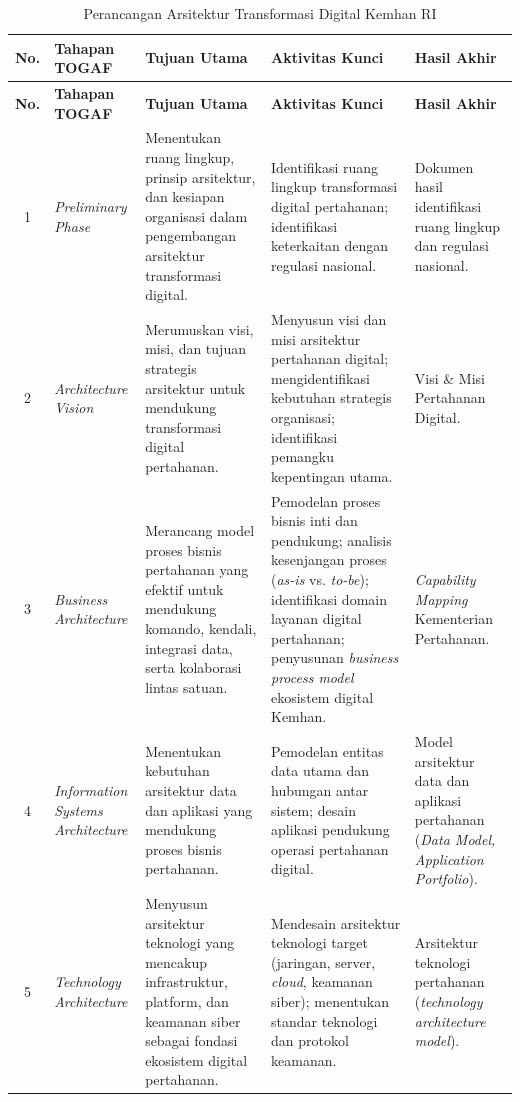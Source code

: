 \begin{longtable}{|c|p{2.4cm}|p{3cm}|p{3.6cm}|p{2.8cm}|}
\caption{Perancangan Arsitektur Transformasi Digital Kemhan RI}
\label{tab:perancangan-arsitektur} \\
\hline
\textbf{No.} & \textbf{Tahapan TOGAF} & \textbf{Tujuan Utama} & \textbf{Aktivitas Kunci} & \textbf{Hasil Akhir} \\
\hline
\endfirsthead

\hline
\textbf{No.} & \textbf{Tahapan TOGAF} & \textbf{Tujuan Utama} & \textbf{Aktivitas Kunci} & \textbf{Hasil Akhir} \\
\hline
\endhead

1 & \textit{Preliminary Phase} & Menentukan ruang lingkup, prinsip arsitektur, dan kesiapan organisasi dalam pengembangan arsitektur transformasi digital.
& Identifikasi ruang lingkup transformasi digital pertahanan; identifikasi keterkaitan dengan regulasi nasional.
& Dokumen hasil identifikasi ruang lingkup dan regulasi nasional. \\
\hline
2 & \textit{Architecture Vision} & Merumuskan visi, misi, dan tujuan strategis arsitektur untuk mendukung transformasi digital pertahanan.
& Menyusun visi dan misi arsitektur pertahanan digital; mengidentifikasi kebutuhan strategis organisasi; identifikasi pemangku kepentingan utama.
& Visi \& Misi Pertahanan Digital. \\
\hline
3 & \textit{Business Architecture} & Merancang model proses bisnis pertahanan yang efektif untuk mendukung komando, kendali, integrasi data, serta kolaborasi lintas satuan.
& Pemodelan proses bisnis inti dan pendukung; analisis kesenjangan proses (\textit{as-is} vs. \textit{to-be}); identifikasi domain layanan digital pertahanan; penyusunan \textit{business process model} ekosistem digital Kemhan.
& \textit{Capability Mapping} Kementerian Pertahanan. \\
\hline
4 & \textit{Information Systems Architecture} & Menentukan kebutuhan arsitektur data dan aplikasi yang mendukung proses bisnis pertahanan.
& Pemodelan entitas data utama dan hubungan antar sistem; desain aplikasi pendukung operasi pertahanan digital.
& Model arsitektur data dan aplikasi pertahanan (\textit{Data Model, Application Portfolio}). \\
\hline
5 & \textit{Technology Architecture} & Menyusun arsitektur teknologi yang mencakup infrastruktur, platform, dan keamanan siber sebagai fondasi ekosistem digital pertahanan.
& Mendesain arsitektur teknologi target (jaringan, server, \textit{cloud}, keamanan siber); menentukan standar teknologi dan protokol keamanan.
& Arsitektur teknologi pertahanan (\textit{technology architecture model}). \\
\hline
\end{longtable}

